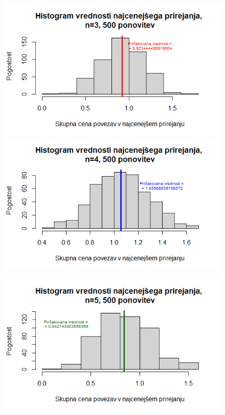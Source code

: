 \documentclass[a4paper, 11pt]{article}
\begin{document}
\begin{figure}[!htb]
      \includegraphics[width=\linewidth]{pricak_vred_n_3.png}
    \endminipage\hfill
      \includegraphics[width=\linewidth]{pricak_vred_n_4.png}
    \endminipage\hfill
\end{figure}

\begin{figure}[!htb]
      \includegraphics[width=\linewidth]{pricak_vred_n_5.png}
    \endminipage\hfill
    \centering
\end{figure}
\end{document}
